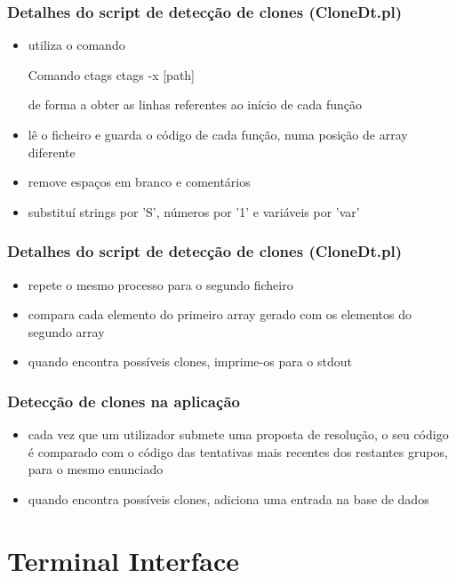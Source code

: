 \documentclass{beamer}
\begin{document}
\begin{frame}[fragile] \frametitle{Detalhes do script de detecção de clones (CloneDt.pl)}
\begin{itemize}
\item utiliza o comando 
\begin{block}{Comando ctags}
ctags -x [path]
\end{block}
de forma a obter as linhas referentes ao início de cada função
\item lê o ficheiro e guarda o código de cada função, numa posição de array diferente
\item remove espaços em branco e comentários
\item substituí strings por 'S', números por '1' e variáveis por 'var' 
\end{itemize}
\end{frame}


\begin{frame}[fragile] \frametitle{Detalhes do script de detecção de clones (CloneDt.pl)}
\begin{itemize}
\item repete o mesmo processo para o segundo ficheiro
\item compara cada elemento do primeiro array gerado com os elementos do segundo array
\item quando encontra possíveis clones, imprime-os para o stdout
\end{itemize}
\end{frame}

\begin{frame}[fragile] \frametitle{Detecção de clones na aplicação}
\begin{itemize}
\item cada vez que um utilizador submete uma proposta de resolução, o seu código é comparado com o código das tentativas mais recentes dos restantes grupos, para o mesmo enunciado
\item quando encontra possíveis clones, adiciona uma entrada na base de dados
\end{itemize}
\end{frame}


\section{Terminal Interface}
\end{document}
